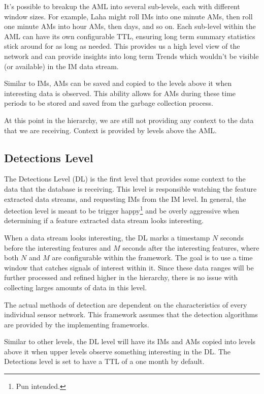 It's possible to breakup the AML into several sub-levels, each with different window sizes. For example, Laha might roll IMs into one minute AMs, then roll one minute AMs into hour AMs, then days, and so on. Each sub-level within the AML can have its own configurable TTL, ensuring long term summary statistics stick around for as long as needed. This provides us a high level view of the network and can provide insights into long term Trends which wouldn't be visible (or available) in the IM data stream.

Similar to IMs, AMs can be saved and copied to the levels above it when interesting data is observed. This ability allows for AMs during these time periods to be stored and saved from the garbage collection process.

At this point in the hierarchy, we are still not providing any context to the data that we are receiving. Context is provided by levels above the AML\@.

\subsection{Detections Level}\label{subsec:detections-level}
The Detections Level (DL) is the first level that provides some context to the data that the database is receiving. This level is responsible watching the feature extracted data streams, and requesting IMs from the IM level. In general, the detection level is meant to be trigger happy\footnote{Pun intended.} and be overly aggressive when determining if a feature extracted data stream looks interesting.

When a data stream looks interesting, the DL marks a timestamp $N$ seconds before the interesting features and $M$ seconds after the interesting features, where both $N$ and $M$ are configurable within the framework. The goal is to use a time window that catches signals of interest within it. Since these data ranges will be further processed and refined higher in the hierarchy, there is no issue with collecting larges amounts of data in this level.

The actual methods of detection are dependent on the characteristics of every individual sensor network. This framework assumes that the detection algorithms are provided by the implementing frameworks.

Similar to other levels, the DL level will have its IMs and AMs copied into levels above it when upper levels observe something interesting in the DL. The Detections level is set to have a TTL of a one month by default.

